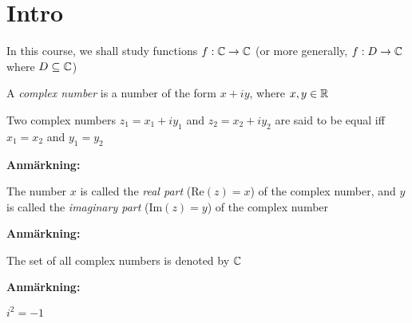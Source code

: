 \section{Intro}
\noindent In this course, we shall study functions $f:\mathbb{C}\to\mathbb{C}$ (or more generally, $f:D\to\mathbb{C}$ where $D\subseteq\mathbb{C}$)
\par\bigskip
\begin{theo}{}
  A \textit{complex number} is a number of the form $x+iy$, where $x,y\in\mathbb{R}$
  \par\bigskip
  \noindent Two complex numbers $z_1 = x_1+iy_1$ and $z_2 = x_2+iy_2$ are said to be equal iff $x_1 = x_2$ and $y_1 = y_2$
\end{theo}
\par\bigskip
\noindent\textbf{Anmärkning:}\par
\noindent The number $x$ is called the \textit{real part} (Re$(z) = x$) of the complex number, and $y$ is called the \textit{imaginary part} (Im$(z) = y$) of the complex number 
\par\bigskip
\noindent\textbf{Anmärkning:}\par
\noindent The set of all complex numbers is denoted by $\mathbb{C}$
\par\bigskip
\noindent\textbf{Anmärkning:}\par
\noindent $i^2 = -1$
\par\bigskip

